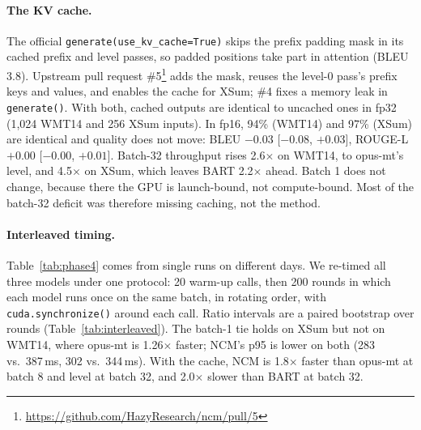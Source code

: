 \documentclass[11pt]{article}
\begin{document}
\paragraph{The KV cache.}\label{sec:cache} The official \texttt{generate(use\_kv\_cache=True)}
skips the prefix padding mask in its cached prefix and level passes, so padded positions
take part in attention (BLEU 3.8). Upstream pull request \#5\footnote{\url{https://github.com/HazyResearch/ncm/pull/5}}
adds the mask, reuses the level-0 pass's prefix keys and values, and enables the cache for
XSum; \#4 fixes a memory leak in \texttt{generate()}. With both, cached outputs are
identical to uncached ones in fp32 (1,024 WMT14 and 256 XSum inputs). In fp16, 94\% (WMT14)
and 97\% (XSum) are identical and quality does not move: BLEU $-0.03$ [$-0.08$, $+0.03$],
ROUGE-L $+0.00$ [$-0.00$, $+0.01$]. Batch-32 throughput rises 2.6$\times$ on WMT14, to
opus-mt's level, and 4.5$\times$ on XSum, which leaves BART 2.2$\times$ ahead. Batch 1 does not
change, because there the GPU is launch-bound, not compute-bound. Most of the batch-32
deficit was therefore missing caching, not the method.

\paragraph{Interleaved timing.} Table~\ref{tab:phase4} comes from single runs on different
days. We re-timed all three models under one protocol: 20 warm-up calls, then 200 rounds in
which each model runs once on the same batch, in rotating order, with
\texttt{cuda.synchronize()} around each call. Ratio intervals are a paired bootstrap over
rounds (Table~\ref{tab:interleaved}). The batch-1 tie holds on XSum but not on WMT14, where
opus-mt is 1.26$\times$ faster; NCM's p95 is lower on both (283 vs.\ 387\,ms, 302 vs.\
344\,ms). With the cache, NCM is 1.8$\times$ faster than opus-mt at batch 8 and level at
batch 32, and 2.0$\times$ slower than BART at batch 32.
\end{document}
